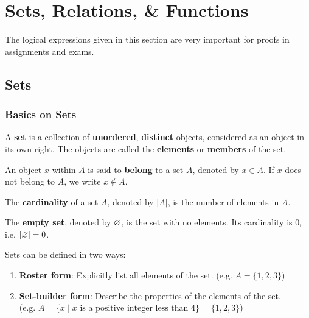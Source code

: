 \section{Sets, Relations, \& Functions}

\begin{remark}
    The logical expressions given in this section are very important for proofs in assignments
    and exams.
\end{remark}

\subsection{Sets}

\subsubsection{Basics on Sets}

\begin{definition}[Set]
    A \textbf{set} is a collection of \textbf{unordered}, \textbf{distinct} objects,
    considered as an object in its own right.
    The objects are called the \textbf{elements} or \textbf{members} of the set.
\end{definition}

\begin{definition}
    An object $x$ within $A$ is said to \textbf{belong} to a set $A$, denoted
    by $x \in A$. If $x$ does not belong to $A$, we write $x \notin A$.
\end{definition}

\begin{definition}[Cardinality]
    The \textbf{cardinality} of a set $A$, denoted by $|A|$, is the number of
    elements in $A$.
\end{definition}

\begin{definition}
    The \textbf{empty set}, denoted by $\varnothing$, is the set with no elements.
    Its cardinality is $0$, i.e. $|\varnothing| = 0$.
\end{definition}

\begin{remark}
    Sets can be defined in two ways:
    \begin{enumerate}
        \item \textbf{Roster form}: Explicitly list all elements of the set.
        (e.g. $A = \{1, 2, 3\}$)
        \item \textbf{Set-builder form}: Describe the properties of the elements
        of the set.\\
        (e.g. $A = \{x \mid x \text{ is a positive integer less than } 4\}
        = \{1, 2, 3\}$)
    \end{enumerate}
\end{remark}

